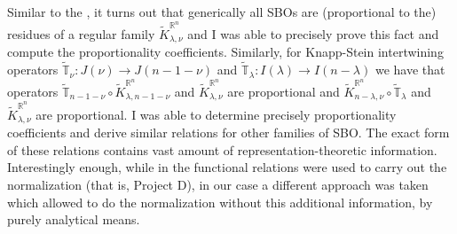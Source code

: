 \documentclass[11pt,a4paper,twoside]{jarticle}
\newcommand{\研究課題名}{Symmetry breaking operators}
\newcommand{\研究機関名}{東京大学}
\newcommand{\申請者氏名}{レオンチエフ\,オレクシィ}
\newcommand{\研究代表者氏名}{\申請者氏名}
\newcommand{\研究期間の最終元号年度}{31}	%
\begin{document}
{	Similar to the \cite{KS15}, it turns out that generically all SBOs are (proportional to the) residues of a regular family $\tilde{K}_{\lambda,\nu}^{\mathbb{R}^n}$
	and I was able to precisely prove this fact and compute the proportionality coefficients.
	Similarly, for Knapp-Stein intertwining operators $\tilde{\mathbb{T}}_\nu:J(\nu)\to J(n-1-\nu)$ and $\tilde{\mathbb{T}}_\lambda:I(\lambda)\to I(n-\lambda)$
	we have that operators $\tilde{\mathbb{T}}_{n-1-\nu}\circ \tilde{K}_{\lambda,n-1-\nu}^{\mathbb{R}^n}$ and $\tilde{K}_{\lambda,\nu}^{\mathbb{R}^n}$ are proportional
	and $\tilde{K}_{n-\lambda,\nu}^{\mathbb{R}^n}\circ \tilde{\mathbb{T}}_\lambda$ and $\tilde{K}_{\lambda,\nu}^{\mathbb{R}^n}$ are proportional. I was able to determine precisely
	proportionality coefficients and derive similar relations for other families of SBO. The exact form of these relations contains vast amount of representation-theoretic information.
	Interestingly enough, while in \cite{KS15} the functional relations were used to carry out the normalization (that is, Project D), in our case a different approach was taken which allowed
	to do the normalization without this additional information, by purely analytical means.
}

\end{document}
